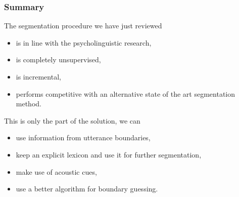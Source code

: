 \begin{frame}
\frametitle{Summary}

The segmentation procedure we have just reviewed
\begin{itemize}
\item is in line with the psycholinguistic research,
\item is completely unsupervised,
\item is incremental,
\item performs competitive with an alternative state 
      of the art segmentation method.
\end{itemize}

This is only the part of the solution, we can
\begin{itemize}
\item use information from utterance boundaries,
\item keep an explicit lexicon and use it for further segmentation,
\item make use of acoustic cues,
\item use a better algorithm for boundary guessing.
\end{itemize}

\end{frame}

